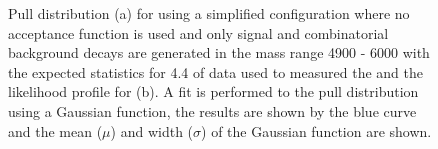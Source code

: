 \begin{figure}[tbp]
\begin{subfigure}[b]{0.48\textwidth}
   \end{subfigure}
    \caption{Pull distribution (a) for \tmumu using a simplified configuration where no acceptance function is used and only signal and combinatorial background decays are generated in the mass range 4900 - 6000 \mevcc with the expected statistics for 4.4 \fb of data used to measured the \el and the likelihood profile for \tmumu (b). A fit is performed to the pull distribution using a Gaussian function, the results are shown by the blue curve and the mean ($\mu$) and width ($\sigma$) of the Gaussian function are shown.}
    \label{fig:taupulls}
\end{figure}



